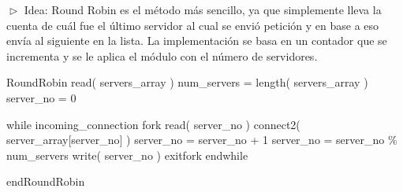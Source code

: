 
$\vartriangleright$ Idea: Round Robin es el método más sencillo, ya que simplemente lleva la cuenta de cuál fue el último servidor al cual se envió
petición y en base a eso envía al siguiente en la lista. La implementación se basa en un contador que se incrementa y se le aplica el módulo con
el número de servidores.
\begin{verbatimtab}[\myTabs]

RoundRobin
read( servers_array )
	num_servers = length( servers_array )
	server_no = 0
	
	while incoming_connection
		fork
			read( server_no )
			connect2( server_array[server_no] )
			server_no = server_no + 1
			server_no = server_no \% num_servers
			write( server_no )
		exitfork
	endwhile

endRoundRobin
\end{verbatimtab}